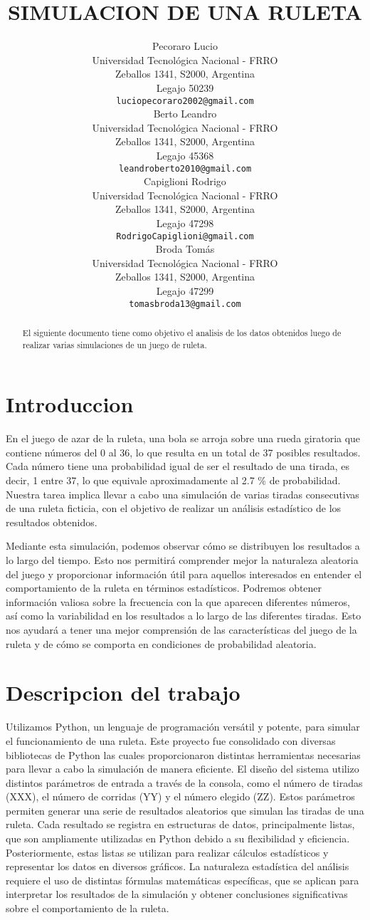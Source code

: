 \documentclass{article}
\title{SIMULACION DE UNA RULETA}
\author{
 Pecoraro Lucio \\
  Universidad Tecnológica Nacional - FRRO\\
  Zeballos 1341, S2000, Argentina\\
  Legajo 50239 \\
  \texttt{luciopecoraro2002@gmail.com} \\
   \And
 Berto Leandro \\
  Universidad Tecnológica Nacional - FRRO\\
  Zeballos 1341, S2000, Argentina\\
  Legajo 45368 \\
  \texttt{leandroberto2010@gmail.com} \\
  \And
 Capiglioni Rodrigo \\
  Universidad Tecnológica Nacional - FRRO\\
  Zeballos 1341, S2000, Argentina\\
  Legajo 47298 \\
  \texttt{RodrigoCapiglioni@gmail.com} \\
  \And
  Broda Tomás \\
  Universidad Tecnológica Nacional - FRRO\\
  Zeballos 1341, S2000, Argentina\\
  Legajo 47299 \\
  \texttt{tomasbroda13@gmail.com} \\
}
\begin{document}
\maketitle
\begin{abstract}
El siguiente documento tiene como objetivo el analisis de los datos obtenidos luego de realizar varias simulaciones de un juego de ruleta.
\end{abstract}




\section{Introduccion}
En el juego de azar de la ruleta, una bola se arroja sobre una rueda giratoria que contiene números del 0 al 36, lo que resulta en un total de 37 posibles resultados. Cada número tiene una probabilidad igual de ser el resultado de una tirada, es decir, 1 entre 37, lo que equivale aproximadamente al 2.7 \% de probabilidad. Nuestra tarea implica llevar a cabo una simulación de varias tiradas consecutivas de una ruleta ficticia, con el objetivo de realizar un análisis estadístico de los resultados obtenidos.

Mediante esta simulación, podemos observar cómo se distribuyen los resultados a lo largo del tiempo. Esto nos permitirá comprender mejor la naturaleza aleatoria del juego y proporcionar información útil para aquellos interesados en entender el comportamiento de la ruleta en términos estadísticos. Podremos obtener información valiosa sobre la frecuencia con la que aparecen diferentes números, así como la variabilidad en los resultados a lo largo de las diferentes tiradas. Esto nos ayudará a tener una mejor comprensión de las características del juego de la ruleta y de cómo se comporta en condiciones de probabilidad aleatoria.


\section{Descripcion del trabajo}
\label{sec:headings}
Utilizamos Python, un lenguaje de programación versátil y potente, para simular el funcionamiento de una ruleta. Este proyecto  fue consolidado con diversas bibliotecas de Python las cuales proporcionaron distintas herramientas necesarias para llevar a cabo la simulación de manera eficiente.
El diseño del sistema utilizo distintos parámetros de entrada a través de la consola, como el número de tiradas (XXX), el número de corridas (YY) y el número elegido (ZZ). Estos parámetros permiten generar una serie de resultados aleatorios que simulan las tiradas de una ruleta.
Cada resultado se registra en estructuras de datos, principalmente listas, que son ampliamente utilizadas en Python debido a su flexibilidad y eficiencia. Posteriormente, estas listas se utilizan para realizar cálculos estadísticos y representar los datos en diversos gráficos.
La naturaleza estadística del análisis requiere el uso de distintas fórmulas matemáticas específicas, que se aplican para interpretar los resultados de la simulación y obtener conclusiones significativas sobre el comportamiento de la ruleta.
\end{document}
